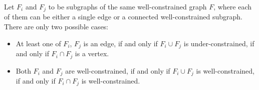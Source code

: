 \begin{lemma}
\label{lem:pinned_union_intersection}
Let $F_i$ and $F_j$ to be subgraphs of the same well-constrained graph $F$, 
where each of them can be either  a single edge or a connected well-constrained subgraph. 
There are only two possible cases: 
\begin{itemize}
\item At least one of $F_i$, $F_j$ is an edge, if and only if $F_i \cup F_j$ is under-constrained, if and only if $F_i \cap F_j$ is a vertex. 
\item Both $F_i$ and $F_j$ are well-constrained, if and only if $F_i \cup F_j$ is well-constrained, if and only if $F_i \cap F_j$ is well-constrained. 
\end{itemize}


\end{lemma}


%

